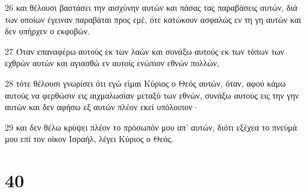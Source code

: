 \par 26 και θέλουσι βαστάσει την αισχύνην αυτών και πάσας τας παραβάσεις αυτών, διά των οποίων έγειναν παραβάται προς εμέ, ότε κατώκουν ασφαλώς εν τη γη αυτών και δεν υπήρχεν ο εκφοβών.
\par 27 Όταν επαναφέρω αυτούς εκ των λαών και συνάξω αυτούς εκ των τόπων των εχθρών αυτών και αγιασθώ εν αυτοίς ενώπιον εθνών πολλών,
\par 28 τότε θέλουσι γνωρίσει ότι εγώ είμαι Κύριος ο Θεός αυτών, όταν, αφού κάμω αυτούς να φερθώσιν εις αιχμαλωσίαν μεταξύ των εθνών, συνάξω αυτούς εις την γην αυτών και δεν αφήσω εξ αυτών πλέον εκεί υπόλοιπον·
\par 29 και δεν θέλω κρύψει πλέον το πρόσωπόν μου απ' αυτών, διότι εξέχεα το πνεύμά μου επί τον οίκον Ισραήλ, λέγει Κύριος ο Θεός.

\chapter{40}

